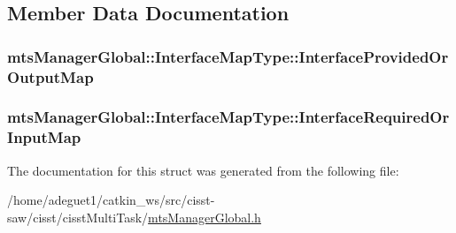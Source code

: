 \subsection{Member Data Documentation}
\hypertarget{structmts_manager_global_1_1_interface_map_type_ac18ba96691e610718e7723deaf599f5a}{
\subsubsection[{Interface\-Provided\-Or\-Output\-Map}]{ mts\-Manager\-Global\-::\-Interface\-Map\-Type\-::\-Interface\-Provided\-Or\-Output\-Map}}\label{structmts_manager_global_1_1_interface_map_type_ac18ba96691e610718e7723deaf599f5a}
\hypertarget{structmts_manager_global_1_1_interface_map_type_a455b80cd0b508438ad1ddba4eabf341c}{
\subsubsection[{Interface\-Required\-Or\-Input\-Map}]{ mts\-Manager\-Global\-::\-Interface\-Map\-Type\-::\-Interface\-Required\-Or\-Input\-Map}}\label{structmts_manager_global_1_1_interface_map_type_a455b80cd0b508438ad1ddba4eabf341c}


The documentation for this struct was generated from the following file\-:\begin{DoxyCompactItemize}
\item 
/home/adeguet1/catkin\-\_\-ws/src/cisst-\/saw/cisst/cisst\-Multi\-Task/\hyperlink{mts_manager_global_8h}{mts\-Manager\-Global.\-h}\end{DoxyCompactItemize}
